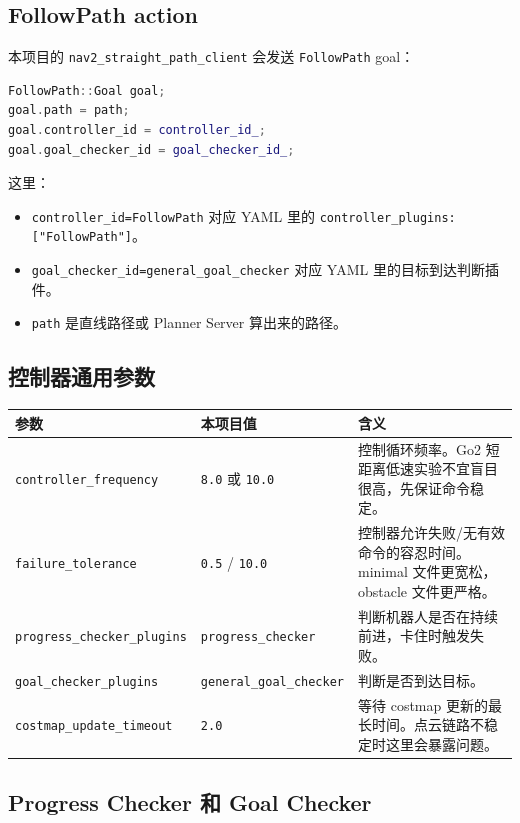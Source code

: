 \documentclass[UTF8,11pt,a4paper,openany]{ctexrep}
\newcommand{\code}[1]{\nolinkurl{#1}}
\newcommand{\param}[1]{\nolinkurl{#1}}
\newcommand{\pkg}[1]{\nolinkurl{#1}}
\newcommand{\actionname}[1]{\nolinkurl{#1}}
\begin{document}
\subsection{FollowPath action}

本项目的 \pkg{nav2_straight_path_client} 会发送 \actionname{FollowPath} goal：

\begin{lstlisting}[language=C++]
FollowPath::Goal goal;
goal.path = path;
goal.controller_id = controller_id_;
goal.goal_checker_id = goal_checker_id_;
\end{lstlisting}

这里：

\begin{itemize}
  \item \param{controller_id=FollowPath} 对应 YAML 里的 \param{controller_plugins: ["FollowPath"]}。
  \item \param{goal_checker_id=general_goal_checker} 对应 YAML 里的目标到达判断插件。
  \item \param{path} 是直线路径或 Planner Server 算出来的路径。
\end{itemize}

\subsection{控制器通用参数}

\begin{longtable}{L{0.28\textwidth}L{0.19\textwidth}L{0.43\textwidth}}
\toprule
参数 & 本项目值 & 含义 \\
\midrule
\param{controller_frequency} & \code{8.0} 或 \code{10.0} & 控制循环频率。Go2 短距离低速实验不宜盲目很高，先保证命令稳定。 \\
\param{failure_tolerance} & \code{0.5} / \code{10.0} & 控制器允许失败/无有效命令的容忍时间。minimal 文件更宽松，obstacle 文件更严格。 \\
\param{progress_checker_plugins} & \code{progress_checker} & 判断机器人是否在持续前进，卡住时触发失败。 \\
\param{goal_checker_plugins} & \code{general_goal_checker} & 判断是否到达目标。 \\
\param{costmap_update_timeout} & \code{2.0} & 等待 costmap 更新的最长时间。点云链路不稳定时这里会暴露问题。 \\
\bottomrule
\end{longtable}

\subsection{Progress Checker 和 Goal Checker}
\end{document}
